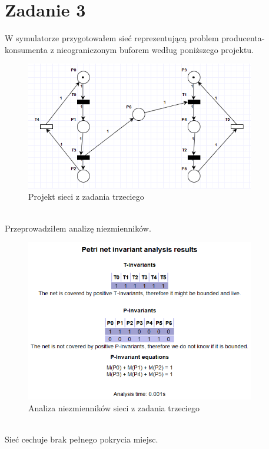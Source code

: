 \documentclass{article}
\begin{document}
    \newpage
    \section{Zadanie 3}
        W symulatorze przygotowałem sieć reprezentującą problem producenta-konsumenta z nieograniczonym buforem według poniższego projektu.
        \begin{figure}[h!]
            \centering
            \includegraphics[width=10cm]{lab6/n3.png}
            \caption{Projekt sieci z zadania trzeciego}
        \end{figure}\\
        \FloatBarrier
        Przeprowadziłem analizę niezmienników. 
        \begin{figure}[h!]
            \centering
            \includegraphics[width=10cm]{lab6/n3_1.png}
            \caption{Analiza niezmienników sieci z zadania trzeciego}
        \end{figure}\\
        \FloatBarrier
        Sieć cechuje brak pełnego pokrycia miejsc. 
    
    \newpage
\end{document}
